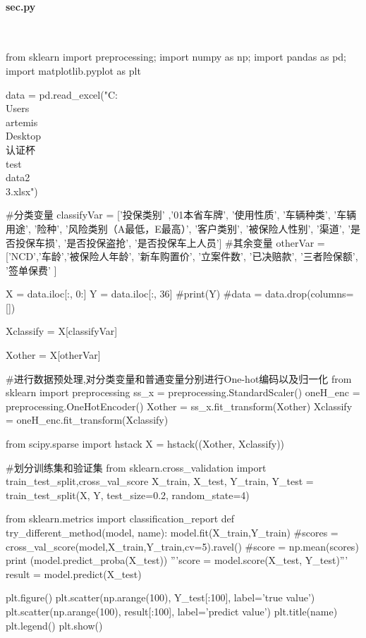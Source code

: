 \documentclass[a4paper]{article}
\begin{document}
		\paragraph{sec.py}\\
		\begin{*sec.py*}
			from sklearn import preprocessing;
			import numpy as np;
			import pandas as pd;
			import matplotlib.pyplot as plt
			
			
			data = pd.read_excel("C:\\Users\\artemis\\Desktop\\认证杯\\test\\data2\\3.xlsx")
			
			
			#分类变量
			classifyVar = ['投保类别' ,'01本省车牌', '使用性质', '车辆种类', '车辆用途',
			'险种',  '风险类别（A最低，E最高）', '客户类别', '被保险人性别', 
			'渠道', '是否投保车损', '是否投保盗抢', '是否投保车上人员']
			#其余变量
			otherVar = ['NCD','车龄','被保险人年龄', '新车购置价', '立案件数', '已决赔款', '三者险保额', '签单保费' ]
			
			X = data.iloc[:, 0:]
			Y = data.iloc[:, 36]
			#print(Y)
			#data = data.drop(columns=[])
			
			Xclassify = X[classifyVar]
			
			Xother = X[otherVar]
			
			
			#进行数据预处理,对分类变量和普通变量分别进行One-hot编码以及归一化
			from sklearn import preprocessing
			ss_x = preprocessing.StandardScaler()
			oneH_enc = preprocessing.OneHotEncoder()
			Xother = ss_x.fit_transform(Xother)
			Xclassify = oneH_enc.fit_transform(Xclassify)
			
			from scipy.sparse import hstack
			X = hstack((Xother, Xclassify))
			
			#划分训练集和验证集
			from sklearn.cross_validation import train_test_split,cross_val_score
			X_train, X_test, Y_train, Y_test = train_test_split(X, Y, test_size=0.2,  random_state=4)
			
			from sklearn.metrics import classification_report
			def try_different_method(model, name):
			model.fit(X_train,Y_train)
			#scores = cross_val_score(model,X_train,Y_train,cv=5).ravel()
			#score = np.mean(scores)
			print (model.predict_proba(X_test))
			'''score = model.score(X_test, Y_test)'''
			result = model.predict(X_test)
			
			plt.figure()
			plt.scatter(np.arange(100),  Y_test[:100],  label='true value')
			plt.scatter(np.arange(100), result[:100],  label='predict value')
			plt.title(name)
			plt.legend()
			plt.show()
			

\end{*sec.py*}
\end{document}
